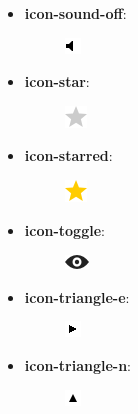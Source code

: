 \documentclass[letterpaper,10pt,english]{sphinxmanual}
\begin{document}
\begin{itemize}
\begin{description}
\end{description}

\item {} \begin{description}
\item[{\textbf{icon-sound-off}:}] \leavevmode
\includegraphics{sound-off.png}

\end{description}

\item {} \begin{description}
\item[{\textbf{icon-star}:}] \leavevmode
\includegraphics{star.png}

\end{description}

\item {} \begin{description}
\item[{\textbf{icon-starred}:}] \leavevmode
\includegraphics{starred.png}

\end{description}

\item {} \begin{description}
\item[{\textbf{icon-toggle}:}] \leavevmode
\includegraphics{toggle.png}

\end{description}

\item {} \begin{description}
\item[{\textbf{icon-triangle-e}:}] \leavevmode
\includegraphics{triangle-e.png}

\end{description}

\item {} \begin{description}
\item[{\textbf{icon-triangle-n}:}] \leavevmode
\includegraphics{triangle-n.png}


\end{description}
\end{itemize}
\end{document}
